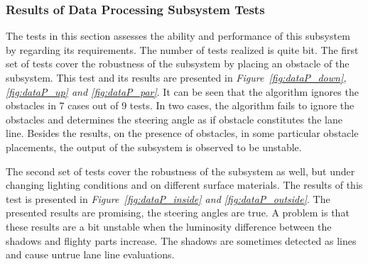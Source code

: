 \documentclass[a4paper,12pt]{article}
\begin{document}
\subsubsection*{Results of Data Processing Subsystem Tests}\label{sec:DataProcessingSubsystemTests}

The tests in this section assesses the ability and performance of this subsystem by regarding its requirements. The number of tests realized is quite  bit. The first set of tests cover the robustness of the subsystem by placing an obstacle of the subsystem. This test and its results are presented in \textit{Figure~\ref{fig:dataP_down},\ref{fig:dataP_up} and \ref{fig:dataP_par}}. It can be seen that the algorithm ignores the obstacles in 7 cases out of 9 tests. In two cases, the algorithm fails to ignore the obstacles and determines the steering angle as if obstacle constitutes the lane line. Besides the results, on the presence of obstacles, in some particular obstacle placements, the output of the subsystem is observed to be unstable.


The second set of tests cover the robustness of the subsystem as well, but under changing lighting conditions and on different surface materials. The results of this test is presented in \textit{Figure~\ref{fig:dataP_inside} and \ref{fig:dataP_outside}}. The presented results are promising, the steering angles are true. A problem is that these results are a bit unstable when the luminosity difference between the shadows and flighty parts increase. The shadows are sometimes detected as lines and cause untrue lane line evaluations.	
\end{document}
